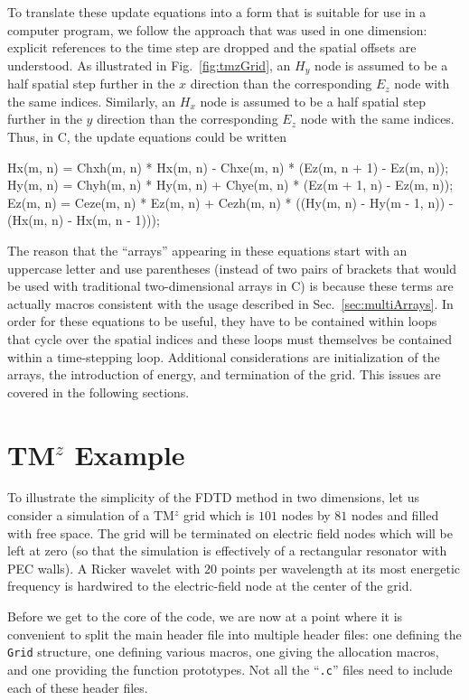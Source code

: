 To translate these update equations into a form that is suitable for
use in a computer program, we follow the approach that was used in
one dimension: explicit references to the time step are dropped and
the spatial offsets are understood.  As illustrated in Fig.\
\ref{fig:tmzGrid}, an $H_y$ node is assumed to be a half spatial step
further in the $x$ direction than the corresponding $E_z$ node with
the same indices.  Similarly, an $H_x$ node is assumed to be a half
spatial step further in the $y$ direction than the corresponding $E_z$
node with the same indices.  Thus, in C, the update equations could be
written
\begin{code}
  Hx(m, n) = Chxh(m, n) * Hx(m, n) - 
     Chxe(m, n) * (Ez(m, n + 1) - Ez(m, n));
  Hy(m, n) = Chyh(m, n) * Hy(m, n) + 
     Chye(m, n) * (Ez(m + 1, n) - Ez(m, n));
  Ez(m, n) = Ceze(m, n) * Ez(m, n) + 
     Cezh(m, n) * ((Hy(m, n) - Hy(m - 1, n)) - (Hx(m, n) - Hx(m, n - 1)));
\end{code}
The reason that the ``arrays'' appearing in these equations start with
an uppercase letter and use parentheses (instead of two pairs of
brackets that would be used with traditional two-dimensional arrays
in C) is because these terms are actually macros consistent with the
usage described in Sec.\ \ref{sec:multiArrays}.  In order for these
equations to be useful, they have to be contained within loops that
cycle over the spatial indices and these loops must themselves be
contained within a time-stepping loop.  Additional considerations are
initialization of the arrays, the introduction of energy, and
termination of the grid.  This issues are covered in the following sections.

\section{TM$^z$ Example}

To illustrate the simplicity of the FDTD method in two dimensions, let
us consider a simulation of a TM$^z$ grid which is $101$ nodes by $81$
nodes and filled with free space.  The grid will be terminated on
electric field nodes which will be left at zero (so that the
simulation is effectively of a rectangular resonator with PEC walls).
A Ricker wavelet with $20$ points per wavelength at its most energetic
frequency is hardwired to the electric-field node at the center of the
grid.  

Before we get to the core of the code, we are now at a point where it
is convenient to split the main header file into multiple header
files: one defining the {\tt Grid} structure, one defining various
macros, one giving the allocation macros, and one providing the
function prototypes.  Not all the ``{\tt .c}'' files need to include
each of these header files.

